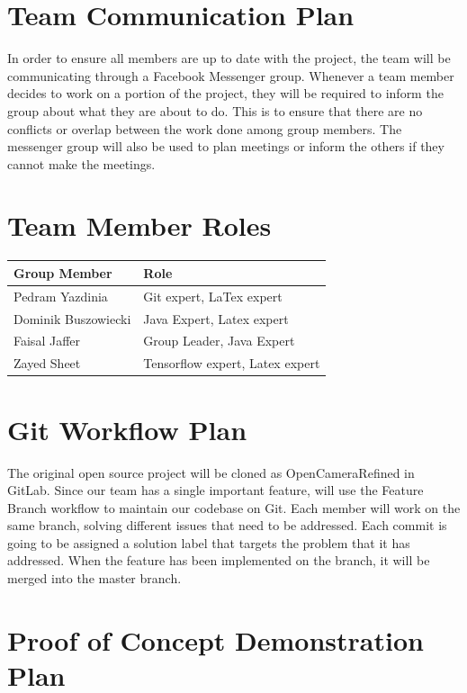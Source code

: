 \documentclass{article}
\begin{document}
\section{Team Communication Plan}

In order to ensure all members are up to date with the project, the team will be communicating through a Facebook Messenger group. Whenever a team member decides to work on a portion of the project, they will be required to inform the group about what they are about to do. This is to ensure that there are no conflicts or overlap between the work done among group members. The messenger group will also be used to plan meetings or inform the others if they cannot make the meetings.

\section{Team Member Roles}

\begin{table}[h]
\begin{tabular}{|l|l|}
\hline
\textbf{Group Member} & \textbf{Role}                   \\ \hline
Pedram Yazdinia       & Git expert, LaTex expert        \\ \hline
Dominik Buszowiecki   & Java Expert, Latex expert       \\ \hline
Faisal Jaffer         & Group Leader, Java Expert       \\ \hline
Zayed Sheet           & Tensorflow expert, Latex expert \\ \hline
\end{tabular}
\end{table}
\section{Git Workflow Plan}

The original open source project will be cloned as OpenCameraRefined in GitLab. Since our team has a single important feature, will use the Feature Branch workflow to maintain our codebase on Git. Each member will work on the same branch, solving different issues that need to be addressed. Each commit is going to be assigned a solution label that targets the problem that it has addressed. When the feature has been implemented on the branch, it will be merged into the master branch.
\section{Proof of Concept Demonstration Plan}
\end{document}
